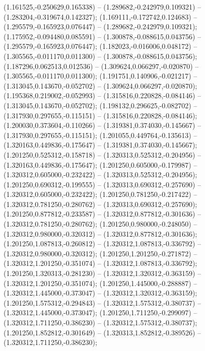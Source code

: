  (1.161525,-0.250629,0.165338) -- (1.289682,-0.242979,0.109321) -- (1.283204,-0.319674,0.142327);
 (1.169111,-0.172742,0.124683) -- (1.295579,-0.165923,0.076447) -- (1.289682,-0.242979,0.109321);
 (1.175952,-0.094480,0.085591) -- (1.300878,-0.088615,0.043756) -- (1.295579,-0.165923,0.076447);
 (1.182023,-0.016006,0.048172) -- (1.305565,-0.011170,0.011300) -- (1.300878,-0.088615,0.043756);
 (1.187296,0.062513,0.012536) -- (1.309624,0.066297,-0.020870) -- (1.305565,-0.011170,0.011300);
 (1.191751,0.140906,-0.021217) -- (1.313045,0.143670,-0.052702) -- (1.309624,0.066297,-0.020870);
 (1.195368,0.219002,-0.052993) -- (1.315816,0.220828,-0.084146) -- (1.313045,0.143670,-0.052702);
 (1.198132,0.296625,-0.082702) -- (1.317930,0.297655,-0.115151) -- (1.315816,0.220828,-0.084146);
 (1.200030,0.373604,-0.110266) -- (1.319381,0.374030,-0.145667) -- (1.317930,0.297655,-0.115151);
 (1.201055,0.449764,-0.135613) -- (1.320163,0.449836,-0.175647) -- (1.319381,0.374030,-0.145667);
 (1.201250,0.525312,-0.158718) -- (1.320313,0.525312,-0.204956) -- (1.320163,0.449836,-0.175647);
 (1.201250,0.605000,-0.179987) -- (1.320312,0.605000,-0.232422) -- (1.320313,0.525312,-0.204956);
 (1.201250,0.690312,-0.199555) -- (1.320313,0.690312,-0.257690) -- (1.320312,0.605000,-0.232422);
 (1.201250,0.781250,-0.217422) -- (1.320312,0.781250,-0.280762) -- (1.320313,0.690312,-0.257690);
 (1.201250,0.877812,-0.233587) -- (1.320312,0.877812,-0.301636) -- (1.320312,0.781250,-0.280762);
 (1.201250,0.980000,-0.248050) -- (1.320312,0.980000,-0.320312) -- (1.320312,0.877812,-0.301636);
 (1.201250,1.087813,-0.260812) -- (1.320312,1.087813,-0.336792) -- (1.320312,0.980000,-0.320312);
 (1.201250,1.201250,-0.271872) -- (1.320312,1.201250,-0.351074) -- (1.320312,1.087813,-0.336792);
 (1.201250,1.320313,-0.281230) -- (1.320312,1.320312,-0.363159) -- (1.320312,1.201250,-0.351074);
 (1.201250,1.445000,-0.288887) -- (1.320312,1.445000,-0.373047) -- (1.320312,1.320312,-0.363159);
 (1.201250,1.575312,-0.294843) -- (1.320312,1.575312,-0.380737) -- (1.320312,1.445000,-0.373047);
 (1.201250,1.711250,-0.299097) -- (1.320312,1.711250,-0.386230) -- (1.320312,1.575312,-0.380737);
 (1.201250,1.852812,-0.301649) -- (1.320313,1.852812,-0.389526) -- (1.320312,1.711250,-0.386230);
